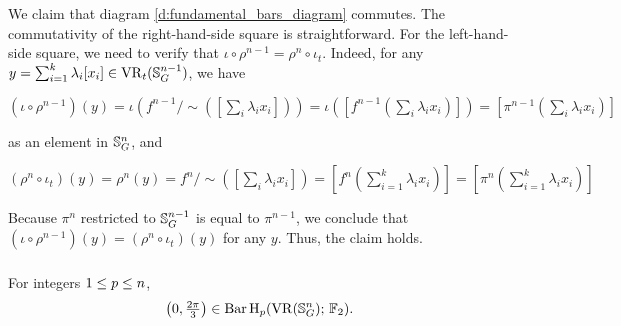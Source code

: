 We claim that diagram \eqref{d:fundamental_bars_diagram} commutes. 
The commutativity of the right-hand-side square is straightforward.
For the left-hand-side square, we need to verify that $\iota \circ \rho^{n-1}=\rho^{n} \circ \iota_t$.
Indeed, for any $y = \sum_{i=1}^k \lambda_i [x_i] \in \operatorname{VR}_t(\mathbb{S}^{n-1}_G)$, we have
\begin{center}
    $(\iota \circ \rho^{n-1})(y)
    =\iota(f^{n-1}/\sim([\sum_i \lambda_i x_i]))
    =\iota([f^{n-1}(\sum_i \lambda_i x_i)])
    =[\pi^{n-1}(\sum_i \lambda_i x_i)]
    $
\end{center}
as an element in $\mathbb{S}^n_G$, and
\begin{center}
    $(\rho^{n} \circ \iota_t)(y) = \rho^{n}(y) = f^{n}/\sim([\sum_i \lambda_i x_i]) = [f^{n}(\sum_{i=1}^k \lambda_i x_i)] = [\pi^{n}(\sum_{i=1}^k \lambda_i x_i)]
    $
\end{center}
Because $\pi^{n}$ restricted to $\mathbb{S}^{n-1}_G$ is equal to $\pi^{n-1}$, we conclude that $(\iota \circ \rho^{n-1})(y) = (\rho^n \circ \iota_t)(y)$ for any $y$.
Thus, the claim holds.

\subsubsection{}

\lemma 
{}
For integers $1 \leq p \leq n$,
\[
\left(0, \tfrac{2\pi}{3}\right) \in \operatorname{Bar} \operatorname{H}_{p}(\operatorname{VR}(\mathbb{S}^n_G);\,{\mathbb{F}_2}).
\]


